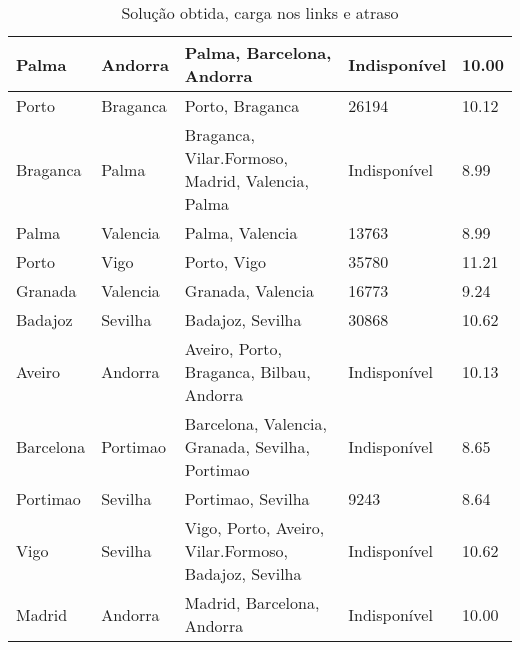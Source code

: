 \begin{table}[!htb]
{\begin{tabular}{|l|l|l|l|l|}
Palma & Andorra & Palma, Barcelona, Andorra & Indisponível & 10.00 \\ \hline
Porto & Braganca & Porto, Braganca & 26194 & 10.12 \\ \hline
Braganca & Palma & Braganca, Vilar.Formoso, Madrid, Valencia, Palma & Indisponível & 8.99 \\ \hline
Palma & Valencia & Palma, Valencia & 13763 & 8.99 \\ \hline
Porto & Vigo & Porto, Vigo & 35780 & 11.21 \\ \hline
Granada & Valencia & Granada, Valencia & 16773 & 9.24 \\ \hline
Badajoz & Sevilha & Badajoz, Sevilha & 30868 & 10.62 \\ \hline
Aveiro & Andorra & Aveiro, Porto, Braganca, Bilbau, Andorra & Indisponível & 10.13 \\ \hline
Barcelona & Portimao & Barcelona, Valencia, Granada, Sevilha, Portimao & Indisponível & 8.65 \\ \hline
Portimao & Sevilha & Portimao, Sevilha & 9243 & 8.64 \\ \hline
Vigo & Sevilha & Vigo, Porto, Aveiro, Vilar.Formoso, Badajoz, Sevilha & Indisponível & 10.62 \\ \hline
Madrid & Andorra & Madrid, Barcelona, Andorra & Indisponível & 10.00 \\ \hline
\end{tabular}}
\caption[]{Solução obtida, carga nos links e atraso}
\end{table}

